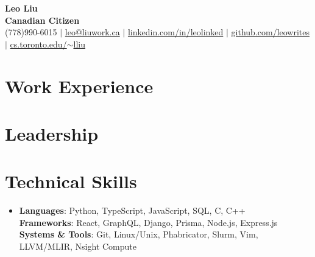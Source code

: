 \documentclass[letterpaper,11pt]{article}
\newcommand{\resumeSubHeadingListStart}{\begin{itemize}[leftmargin=0in, rightmargin=0in, label={}]}
\newcommand{\resumeSubHeadingListEnd}{\end{itemize}}
\begin{document}

\begin{center}
    {\Huge \color{blue}\textbf{Leo Liu}} \\
    \textbf{Canadian Citizen} \\
    (778)990-6015 $|$ \href{mailto:leo@liuwork.ca}{leo@liuwork.ca} $|$ 
    \href{https://linkedin.com/in/leolinked}{linkedin.com/in/leolinked} $|$
    \href{https://github.com/leowrites}{github.com/leowrites} $|$
    \href{https://www.cs.toronto.edu/~lliu}{cs.toronto.edu/$\sim$lliu}
    \vspace{-8pt}
\end{center}



\section{Work Experience}
    \resumeSubHeadingListStart
        
        
        
        
    \resumeSubHeadingListEnd

\section{Leadership}
    \resumeSubHeadingListStart
        
    \resumeSubHeadingListEnd


\section{Technical Skills}
 \begin{itemize}[leftmargin=0in, label={}]
    \item
        \textbf{Languages}: Python, TypeScript, JavaScript, SQL, C, C++ \\
        \textbf{Frameworks}: React, GraphQL, Django, Prisma, Node.js, Express.js \\
        \textbf{Systems \& Tools}: Git, Linux/Unix, Phabricator, Slurm, Vim, LLVM/MLIR, Nsight Compute \\
 \end{itemize}
 
\end{document}
